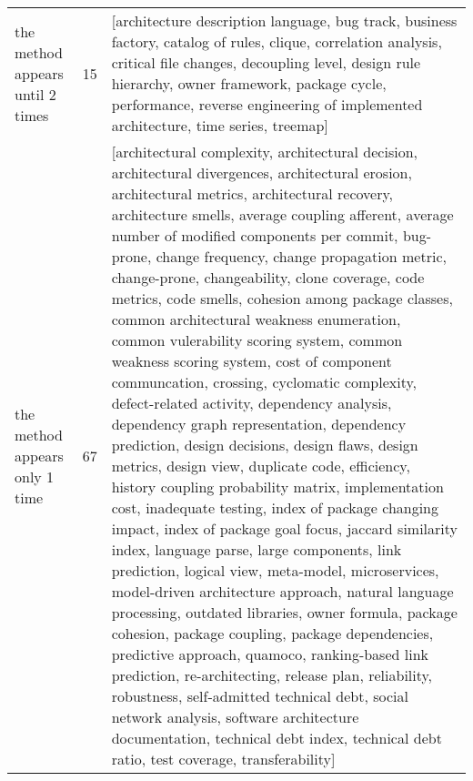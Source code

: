 \begin{tabular}{lrl}
      the method appears until 2 times &     15 &                                                                                                                                                                                                                                                                                                                                                                                                                                                                                                                                                                                                                                                                                                                                                                                                                                                                                                                                                                                                                                                                                                                                                                                                                                [architecture description language, bug track, business factory, catalog of rules, clique, correlation analysis, critical file changes, decoupling level, design rule hierarchy, owner framework, package cycle, performance, reverse engineering of implemented architecture, time series, treemap] \\
        the method appears only 1 time &     67 &  [architectural complexity, architectural decision, architectural divergences, architectural erosion, architectural metrics, architectural recovery, architecture smells, average coupling afferent, average number of modified components per commit, bug-prone, change frequency, change propagation metric, change-prone, changeability, clone coverage, code metrics, code smells, cohesion among package classes, common architectural weakness enumeration, common vulerability scoring system, common weakness scoring system, cost of component communcation, crossing, cyclomatic complexity, defect-related activity, dependency analysis, dependency graph representation, dependency prediction, design decisions, design flaws, design metrics, design view, duplicate code, efficiency, history coupling probability matrix, implementation cost, inadequate testing, index of package changing impact, index of package goal focus, jaccard similarity index, language parse, large components, link prediction, logical view, meta-model, microservices, model-driven architecture approach, natural language processing, outdated libraries, owner formula, package cohesion, package coupling, package dependencies, predictive approach, quamoco, ranking-based link prediction, re-architecting, release plan, reliability, robustness, self-admitted technical debt, social network analysis, software architecture documentation, technical debt index, technical debt ratio, test coverage, transferability] \\
\bottomrule
\end{tabular}

